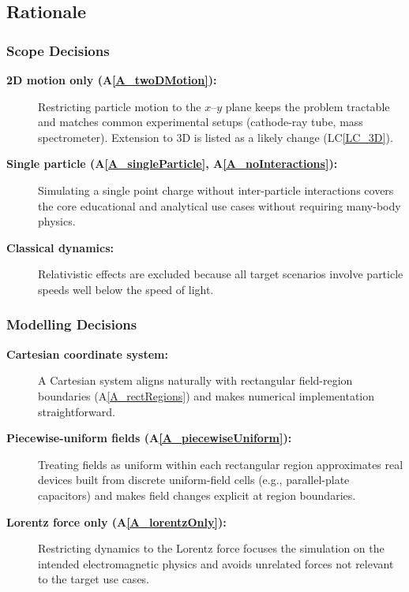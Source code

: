 \documentclass[12pt]{article}
\newcommand{\aref}[1]{A\ref{#1}}
\newcommand{\lcref}[1]{LC\ref{#1}}
\begin{document}
\subsection{Rationale}

\subsubsection*{Scope Decisions}
\begin{description}
\item[\textbf{2D motion only (\aref{A_twoDMotion}):}]
  Restricting particle motion to the $x$--$y$ plane keeps the problem tractable and
  matches common experimental setups (cathode-ray tube, mass spectrometer). Extension
  to 3D is listed as a likely change (\lcref{LC_3D}).
\item[\textbf{Single particle (\aref{A_singleParticle}, \aref{A_noInteractions}):}]
  Simulating a single point charge without inter-particle interactions covers the core
  educational and analytical use cases without requiring many-body physics.
\item[\textbf{Classical dynamics:}]
  Relativistic effects are excluded because all target scenarios involve particle speeds
  well below the speed of light.
\end{description}

\subsubsection*{Modelling Decisions}
\begin{description}
\item[\textbf{Cartesian coordinate system:}]
  A Cartesian system aligns naturally with rectangular field-region boundaries
  (\aref{A_rectRegions}) and makes numerical implementation straightforward.
\item[\textbf{Piecewise-uniform fields (\aref{A_piecewiseUniform}):}]
  Treating fields as uniform within each rectangular region approximates real devices
  built from discrete uniform-field cells (e.g., parallel-plate capacitors) and makes
  field changes explicit at region boundaries.
\item[\textbf{Lorentz force only (\aref{A_lorentzOnly}):}]
  Restricting dynamics to the Lorentz force focuses the simulation on the intended
  electromagnetic physics and avoids unrelated forces not relevant to the target use cases.
\end{description}
\end{document}
